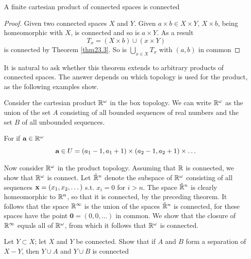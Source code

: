 \documentclass[11pt]{article}
\begin{document}
\begin{theorem}[]
A finite cartesian product of connected spaces is connected
\end{theorem}

\begin{proof}
Given two connected spaces \(X\) and \(Y\). Given \(a\times b\in X\times Y\), \(X\times b\), being homeomorphic
with \(X\), is connected and so is \(a\times Y\). As a result
\begin{equation*}
T_x=(X\times b)\cup(x\times Y)
\end{equation*}
is connected by Theorem \ref{thm23.3}. So is \(\bigcup_{x\in X}T_x\) with \((a,b)\) in common
\end{proof}

It is natural to ask whether this theorem extends to arbitrary products of connected spaces. The
answer depends on which topology is used for the product, as the following examples show.

\begin{examplle}[]
Consider the cartesian product \(\mathbb{R}^\omega\) in the box topology. We can write \(\mathbb{R}^\omega\) as the union of
the set \(A\) consisting of all bounded sequences of real numbers and the set \(B\) of all
unbounded sequences.

For if \(\operatorname{\textbf{a}}\in\mathbb{R}^\omega\)
\begin{equation*}
\operatorname{\textbf{a}}\in U=(a_1-1,a_1+1)\times(a_2-1,a_2+1)\times\dots
\end{equation*}
\end{examplle}

\begin{examplle}[]
Now consider \(\mathbb{R}^\omega\) in the product topology. Assuming that \(\mathbb{R}\) is connected, we show
that \(\mathbb{R}^\omega\) is connect. Let \(\tilde{\mathbb{R}}^n\) denote the subspace of \(\mathbb{R}^\omega\) consisting of all
sequences \(\operatorname{\textbf{x}}=(x_1,x_2,\dots)\) s.t. \(x_i=0\) for \(i>n\). The space \(\tilde{\mathbb{R}}^n\) is clearly
homeomorphic to \(\mathbb{R}^n\), so that it is connected, by the preceding theorem. It follows that the
space \(\mathbb{R}^\infty\) is the union of the spaces \(\tilde{\mathbb{R}}^n\) is connected, for these spaces have the
point \(\textbf{0}=(0,0,\dots)\) in common. We show that the closure of \(\mathbb{R}^\infty\) equals all
of \(\mathbb{R}^\omega\), from which it follows that \(\mathbb{R}^\omega\) is connected.
\end{examplle}

\begin{exercise}
\label{ex23.12}
Let \(Y\subset X\); let \(X\) and \(Y\) be connected. Show that if \(A\) and \(B\) form a separation
of \(X-Y\), then \(Y\cup A\) and \(Y\cup B\) is connected
\end{exercise}
\end{document}
